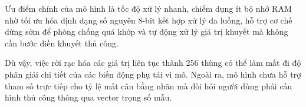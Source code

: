 Ưu điểm chính của mô hình là tốc độ xử lý nhanh, chiếm dụng ít bộ nhớ RAM nhờ tối ưu hóa định dạng số nguyên 8-bit kết hợp xử lý đa luồng, hỗ trợ cơ chế dừng sớm để phòng chống quá khớp và tự động xử lý giá trị khuyết mà không cần bước điền khuyết thủ công.

Dù vậy, việc rời rạc hóa các giá trị liên tục thành 256 thùng có thể làm mất đi độ phân giải chi tiết của các biến động phụ tải vi mô. Ngoài ra, mô hình chưa hỗ trợ tham số trực tiếp cho tỷ lệ mất cân bằng nhãn mà đòi hỏi người dùng phải cấu hình thủ công thông qua vector trọng số mẫu.
